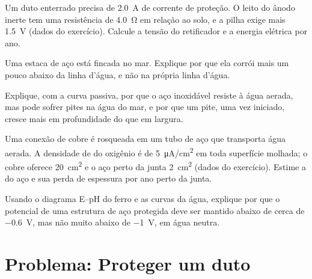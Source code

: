 \begin{exercise}[$\star\star$]\label{exo:b2:corrosion:8}
Um duto enterrado precisa de \qty{2.0}{A} de corrente de proteção. O leito do
ânodo inerte tem uma resistência de \qty{4.0}{\ohm} em relação ao solo, e a
pilha exige mais \qty{1.5}{V} (dados do exercício). Calcule a tensão do
retificador e a energia elétrica por ano.
\end{exercise}

\begin{exercise}[$\star\star$]\label{exo:b2:corrosion:9}
Uma estaca de aço está fincada no mar. Explique por que ela corrói mais um
pouco abaixo da linha d'água, e não na própria linha d'água.
\end{exercise}

\begin{exercise}[$\star\star\star$]\label{exo:b2:corrosion:10}
Explique, com a curva passiva, por que o aço inoxidável resiste à água aerada,
mas pode sofrer pites na água do mar, e por que um pite, uma vez iniciado,
cresce mais em profundidade do que em largura.
\end{exercise}

\begin{exercise}[$\star\star\star$]\label{exo:b2:corrosion:11}
Uma conexão de cobre é rosqueada em um tubo de aço que transporta água aerada.
A densidade de  do oxigênio é de \qty{5}{\micro A/cm^2} em toda
superfície molhada; o cobre oferece \qty{20}{cm^2} e o aço perto da junta
\qty{2}{cm^2} (dados do exercício). Estime a  do aço e sua
perda de espessura por ano perto da junta.
\end{exercise}

\begin{exercise}[$\star\star\star$]\label{exo:b2:corrosion:12}
Usando o diagrama E--pH do ferro e as curvas da água, explique por que o
potencial de uma estrutura de aço protegida deve ser mantido abaixo de cerca de
\qty{-0.6}{V}, mas não muito abaixo de \qty{-1}{V}, em água neutra.
\end{exercise}

\section{Problema: Proteger um duto}

